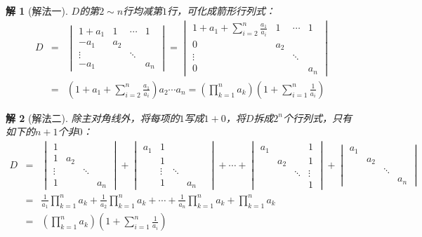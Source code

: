 \documentclass[a4paper]{book}
\newtheorem*{solution}{解}
\begin{document}
\begin{solution}[解法一]
$D$的第$2\sim n$行均减第$1$行，可化成箭形行列式：
\begin{eqnarray*}
D & = & \begin{vmatrix} 1+a_1 & 1 & \cdots & 1 \\ -a_1 & a_2 & & \\ \vdots & & \ddots & \\ -a_1 & & & a_n \end{vmatrix} = \begin{vmatrix} 1+a_1+\sum\limits_{i=2}^n\frac{a_1}{a_i} & 1 & \cdots & 1 \\ 0 & a_2 & & \\ \vdots & & \ddots & \\ 0 & & & a_n \end{vmatrix} \\
& = & (1+a_1+\sum\limits_{i=2}^n\frac{a_1}{a_i})a_2\cdots a_n = (\prod\limits_{k=1}^n a_k)(1+\sum\limits_{i=1}^n\frac{1}{a_i})
\end{eqnarray*}
\end{solution}

\begin{solution}[解法二]
除主对角线外，将每项的$1$写成$1+0$，将$D$拆成$2^n$个行列式，只有如下的$n+1$个非$0$：
\begin{eqnarray*}
D & = & \begin{vmatrix} 1 & & & \\ 1 & a_2 & & \\ \vdots & & \ddots & \\ 1 & & & a_n \end{vmatrix} + \begin{vmatrix} a_1 & 1 & & \\ & 1 & & & \\ & \vdots & \ddots & \\ & 1 & & a_n \end{vmatrix} + \cdots + \begin{vmatrix} a_1 & & & 1 \\ & a_2 & & 1 \\ & & \ddots & \vdots \\  & & & 1 \end{vmatrix} + \begin{vmatrix} a_1 & & & \\ & a_2 & & \\ & & \ddots & \\ & & & a_n \end{vmatrix} \\
& = & \frac{1}{a_1}\prod\limits_{k=1}^n a_k + \frac{1}{a_2}\prod\limits_{k=1}^n a_k + \cdots + \frac{1}{a_n}\prod\limits_{k=1}^n a_k + \prod\limits_{k=1}^n a_k \\
& = & (\prod\limits_{k=1}^n a_k)(1+\sum\limits_{i=1}^n\frac{1}{a_i})
\end{eqnarray*}
\end{solution}
\end{document}
